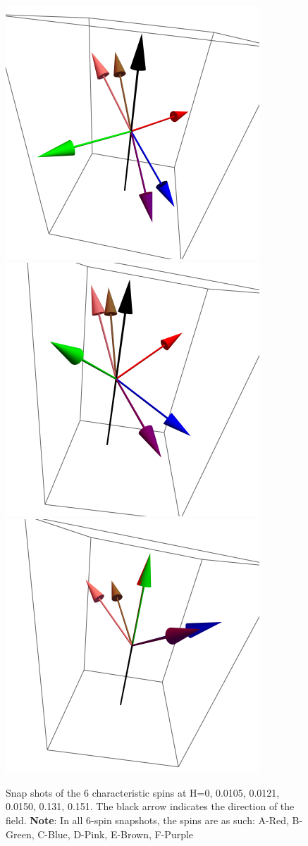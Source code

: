 \documentclass{article}
\begin{document}
\begin{figure}[ht]
\includegraphics[scale=0.3]{HVariedData/Pictures/001Inc151.png}
\includegraphics[scale=0.3]{HVariedData/Pictures/001Inc30S.png}
\includegraphics[scale=0.3]{HVariedData/Pictures/001Inc35S.png}
\caption{Snap shots of the 6 characteristic spins at H=0, 0.0105, 0.0121, 0.0150, 0.131, 0.151. The black arrow
indicates the direction of the field. \textbf{Note}: In all 6-spin snapshots, the spins are as such: A-Red, B-Green, C-Blue, D-Pink, E-Brown, F-Purple}
\end{figure}
\end{document}
